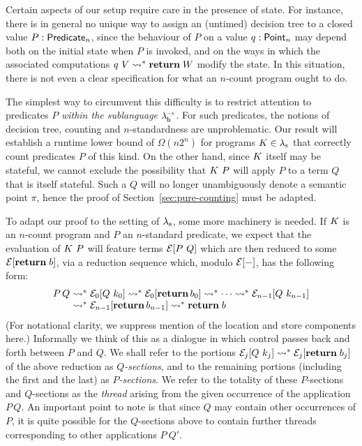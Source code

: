 \documentclass[12pt,phd,lfcs,twoside,openright,logo,leftchapter,normalheadings]{infthesis}
\theoremstyle{plain}
\theoremstyle{definition}
\begin{document}
Certain aspects of our setup require care in the presence of state.
For instance, there is in general no unique way to assign an (untimed)
decision tree to a closed value $P : \mathsf{Predicate}_n$, since the
behaviour of $P$ on a value $q : \mathsf{Point}_n$ may depend both on the
initial state when $P$ is invoked, and on the ways in which the
associated computations $q~V \leadsto^\ast \mathbf{return}\;W$ modify the
state.  In this situation, there is not even a clear specification for
what an $n$-count program ought to do.

The simplest way to circumvent this difficulty is to restrict
attention to predicates $P$ \emph{within the sublanguage $\lambda^\rightarrow_{\mathsf{b}}$}.
For such predicates, the notions of decision tree, counting and
$n$-standardness are unproblematic. Our result will establish a
runtime lower bound of $\Omega(n2^n)$ for programs $K \in
\lambda_{\textrm{\normalfont s}}$ that correctly count predicates $P$ of this kind.
%
On the other hand, since $K$ itself may be stateful, we
cannot exclude the possibility that $K~P$ will apply $P$ to a
term $Q$ that is itself stateful. Such a $Q$ will no longer
unambiguously denote a semantic point $\pi$, hence the proof of
Section~\ref{sec:pure-counting} must be adapted.

To adapt our proof to the setting of $\lambda_{\textrm{\normalfont s}}$, some more machinery is
needed.  If $K$ is an $n$-count program and $P$ an
$n$-standard predicate, we expect that the evaluation of
$K~P$ will feature terms $\mathcal{E}[P~Q]$ which are then reduced to
some $\mathcal{E}[\mathbf{return}\;b]$, via a reduction sequence which, modulo
$\mathcal{E}[-]$, has the following form:
%
{
\[
  P\,Q~
    \bl \reducesto^\ast \EC_0[Q~k_0] \reducesto^\ast \EC_0[\Return\,b_0] \reducesto^\ast \cdots
        \reducesto^\ast \EC_{n-1}[Q~k_{n-1}]\\
        \reducesto^\ast \EC_{n-1}[\Return\,b_{n-1}]
        \reducesto^\ast \Return\;b
    \el
\]}%
%
(For notational clarity, we suppress mention of the location and store
components here.)  Informally we think of this as a dialogue in
which control passes back and forth between $P$ and $Q$. We shall
refer to the portions $\mathcal{E}_j[Q~k_j] \leadsto^\ast
\mathcal{E}_j[\mathbf{return}\;b_j]$ of the above reduction as \emph{$Q$-sections},
and to the remaining portions (including the first and the last) as
\emph{$P$-sections}. We refer to the totality of these $P$-sections
and $Q$-sections as the \emph{thread} arising from the given
occurrence of the application $P\,Q$.  An important point to note is
that since $Q$ may contain other occurrences of $P$, it is quite
possible for the $Q$-sections above to contain further threads
corresponding to other applications $P~Q'$.
\end{document}
